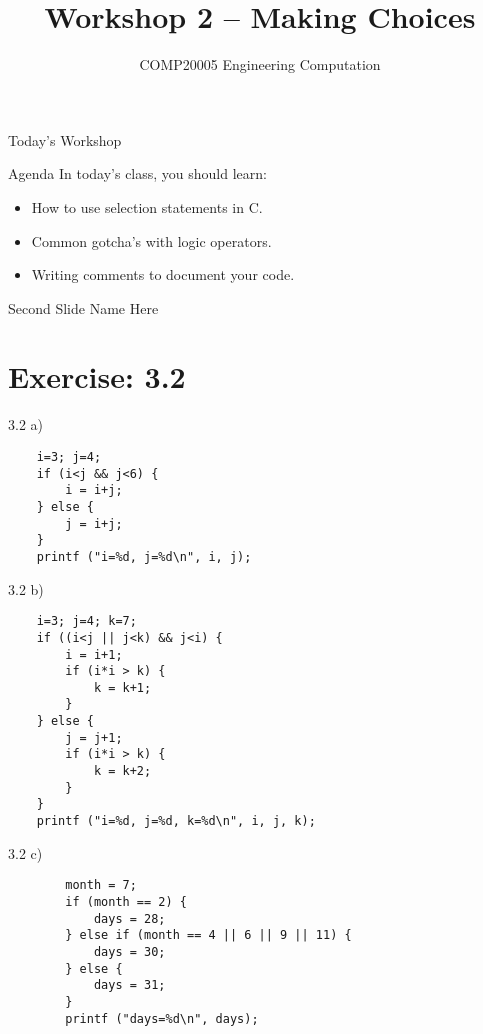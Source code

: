 \documentclass{beamer}
\title{Workshop 2 -- Making Choices}
\author{COMP20005 Engineering Computation}
\institute{The University of Melbourne}
\begin{document}
\begin{frame}
    \titlepage
\end{frame}

\begin{frame}{Today's Workshop}
    \begin{block}{Agenda}
        In today's class, you should learn:
        \begin{itemize}
            \item How to use selection statements in C.
            \item Common gotcha's with logic operators.
            \item Writing comments to document your code.
        \end{itemize}
    \end{block}
\end{frame}

\begin{frame}{Second Slide Name Here}
\end{frame}

\section{Exercise: 3.2}

\begin{frame}[fragile]{3.2 a)}
    \begin{verbatim}
    i=3; j=4;
    if (i<j && j<6) {
        i = i+j;
    } else {
        j = i+j;
    }
    printf ("i=%d, j=%d\n", i, j);
    \end{verbatim}
\end{frame}

\begin{frame}[fragile]{3.2 b)}
    \begin{verbatim}
    i=3; j=4; k=7;
    if ((i<j || j<k) && j<i) {
        i = i+1;
        if (i*i > k) {
            k = k+1;
        }
    } else {
        j = j+1;
        if (i*i > k) {
            k = k+2;
        }
    }
    printf ("i=%d, j=%d, k=%d\n", i, j, k);
    \end{verbatim}
\end{frame}

\begin{frame}[fragile]{3.2 c)}
    \begin{verbatim}
        month = 7;
        if (month == 2) {
            days = 28;
        } else if (month == 4 || 6 || 9 || 11) {
            days = 30;
        } else {
            days = 31;
        }
        printf ("days=%d\n", days);
    \end{verbatim}
\end{frame}
\end{document}
